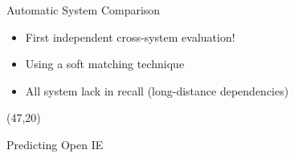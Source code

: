 \documentclass[final]{beamer}
\begin{document}
\begin{frame}{}
\begin{textblock}{39}
\begin{block}{Automatic System Comparison}

  
  
  \begin{itemize}
    \setlength\itemsep{1em}
  \item \alert{First independent cross-system evaluation!}
      \item Using a soft matching technique
  \item All system lack in recall (long-distance dependencies)
  \end{itemize}
\end{block}

\end{textblock}



\begin{textblock}{39}(47,20)
\begin{block}{Predicting Open IE}

\end{block}

\end{textblock}

\end{frame}
\end{document}
